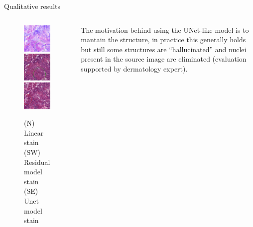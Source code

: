 \documentclass[t]{beamer}
\begin{document}
\begin{frame}{Qualitative results}

\begin{columns}

\begin{column}{0.6\textwidth}
\begin{figure}
\centering
\includegraphics[scale=0.3]{104_real_A}\\
\vfill
\includegraphics[scale=0.3]{104_fake_B-resnet}\hspace{0.15\textwidth}%
\includegraphics[scale=0.3]{104_fake_B-unet}
\caption{(N) Linear stain (SW) Residual model stain (SE) Unet model stain}
\end{figure}
\end{column}

\begin{column}{0.4\textwidth}
The motivation behind using the UNet-like model is to mantain the structure,
in practice this generally holds but still some structures
are ``hallucinated'' and nuclei present in the source image are eliminated
(evaluation supported by dermatology expert).
\end{column}

\end{columns}

\end{frame}
\end{document}

